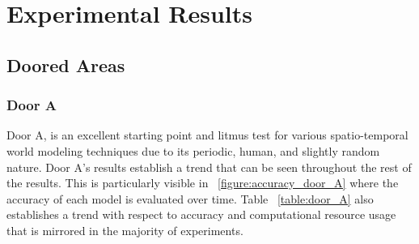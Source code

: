 

\chapter{Experimental Results}

\section{ Doored Areas }

\subsection { Door A }

Door A, is an excellent starting point and litmus test for various spatio-temporal
world modeling techniques due to its periodic, human, and slightly random nature.
Door A's results establish a trend that can be seen
throughout the rest of the results. This is particularly visible in ~\ref{figure:accuracy_door_A}
where the accuracy of each model is evaluated over time. Table ~\ref{table:door_A}
also establishes a trend with respect to accuracy and computational resource
usage that is mirrored in the majority of experiments.\\

\begin{table}[h!]
  \centering
  \caption{Door A Data Overview}
  \label{table:door_A}
\end{table}

